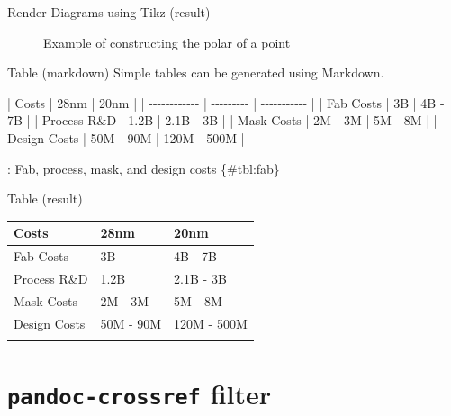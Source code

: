 \documentclass[
  10pt,
  ignorenonframetext,
  serif,onlymath]{beamer}
\newenvironment{Shaded}{}{}
\newcommand{\NormalTok}[1]{#1}
\begin{document}
\begin{frame}{Render Diagrams using Tikz (result)}
\protect\hypertarget{render-diagrams-using-tikz-result}{}
\begin{figure}[hp]
\centering

\caption{Example of constructing
    the polar of a point}%
\label{fig:pole2polar}
\end{figure}
\end{frame}

\begin{frame}[fragile]{Table (markdown)}
\protect\hypertarget{table-markdown}{}
Simple tables can be generated using Markdown.

\begin{Shaded}
\begin{Highlighting}[]
\NormalTok{| Costs        | 28nm      | 20nm        |}
\NormalTok{| {-}{-}{-}{-}{-}{-}{-}{-}{-}{-}{-}{-} | {-}{-}{-}{-}{-}{-}{-}{-}{-} | {-}{-}{-}{-}{-}{-}{-}{-}{-}{-}{-} |}
\NormalTok{| Fab Costs    | 3B        | 4B {-} 7B     |}
\NormalTok{| Process R\&D  | 1.2B      | 2.1B {-} 3B   |}
\NormalTok{| Mask Costs   | 2M {-} 3M   | 5M {-} 8M     |}
\NormalTok{| Design Costs | 50M {-} 90M | 120M {-} 500M |}

\NormalTok{: Fab, process, mask, and design}
\NormalTok{  costs \{\#tbl:fab\}}
\end{Highlighting}
\end{Shaded}
\end{frame}

\begin{frame}{Table (result)}
\protect\hypertarget{table-result}{}
\begin{longtable}[]{@{}lll@{}}
\toprule\noalign{}
Costs & 28nm & 20nm \\
\midrule\noalign{}
\endhead
Fab Costs & 3B & 4B - 7B \\
Process R\&D & 1.2B & 2.1B - 3B \\
Mask Costs & 2M - 3M & 5M - 8M \\
Design Costs & 50M - 90M & 120M - 500M \\
\bottomrule\noalign{}
\end{longtable}
\end{frame}

\hypertarget{pandoc-crossref-filter}{%
\section{\texorpdfstring{\texttt{pandoc-crossref}
filter}{pandoc-crossref filter}}\label{pandoc-crossref-filter}}
\end{document}
